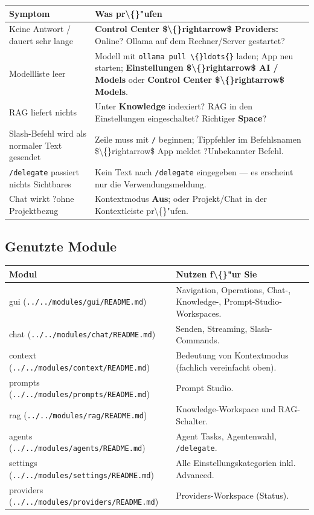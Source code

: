 \begin{center}
\begin{tabular}{ll}
\hline
Symptom & Was pr\textbackslash\{\}"ufen \\
\hline
Keine Antwort / dauert sehr lange & \textbf{Control Center \$\textbackslash\{\}rightarrow\$ Providers:} Online? Ollama auf dem Rechner/Server gestartet? \\
Modellliste leer & Modell mit \texttt{ollama pull \textbackslash\{\}ldots\{\}} laden; App neu starten; \textbf{Einstellungen \$\textbackslash\{\}rightarrow\$ AI / Models} oder \textbf{Control Center \$\textbackslash\{\}rightarrow\$ Models}. \\
RAG liefert nichts & Unter \textbf{Knowledge} indexiert? RAG in den Einstellungen eingeschaltet? Richtiger \textbf{Space}? \\
Slash-Befehl wird als normaler Text gesendet & Zeile muss mit \texttt{/} beginnen; Tippfehler im Befehlsnamen \$\textbackslash\{\}rightarrow\$ App meldet ?Unbekannter Befehl\texttt{}. \\
\texttt{/delegate} passiert nichts Sichtbares & Kein Text nach \texttt{/delegate} eingegeben --- es erscheint nur die Verwendungsmeldung. \\
Chat wirkt ?ohne Projektbezug\texttt{} & Kontextmodus \textbf{Aus}; oder Projekt/Chat in der Kontextleiste pr\textbackslash\{\}"ufen. \\
\hline
\end{tabular}
\end{center}

\subsection{Genutzte Module}

\begin{center}
\begin{tabular}{ll}
\hline
Modul & Nutzen f\textbackslash\{\}"ur Sie \\
\hline
gui (\texttt{../../modules/gui/README.md}) & Navigation, Operations, Chat-, Knowledge-, Prompt-Studio-Workspaces. \\
chat (\texttt{../../modules/chat/README.md}) & Senden, Streaming, Slash-Commands. \\
context (\texttt{../../modules/context/README.md}) & Bedeutung von Kontextmodus (fachlich vereinfacht oben). \\
prompts (\texttt{../../modules/prompts/README.md}) & Prompt Studio. \\
rag (\texttt{../../modules/rag/README.md}) & Knowledge-Workspace und RAG-Schalter. \\
agents (\texttt{../../modules/agents/README.md}) & Agent Tasks, Agentenwahl, \texttt{/delegate}. \\
settings (\texttt{../../modules/settings/README.md}) & Alle Einstellungskategorien inkl. Advanced. \\
providers (\texttt{../../modules/providers/README.md}) & Providers-Workspace (Status). \\
\hline
\end{tabular}
\end{center}

